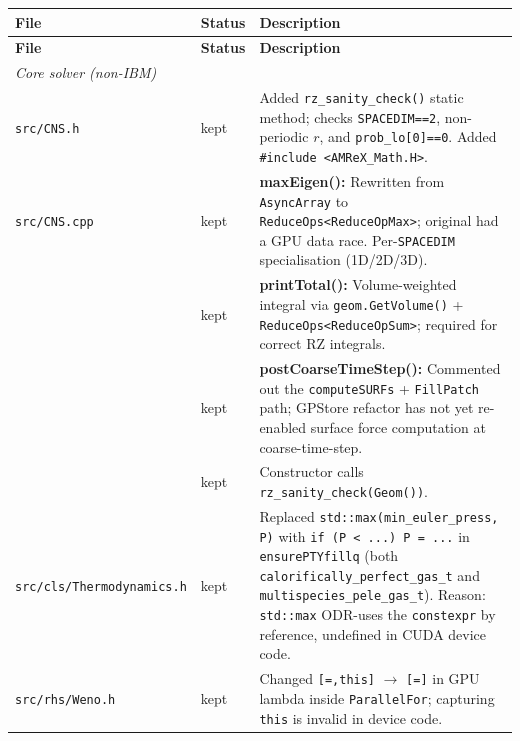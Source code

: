 \documentclass[11pt,a4paper]{article}
\begin{document}
\begin{longtable}{p{4.2cm} p{1.2cm} p{8.5cm}}
\toprule
\textbf{File} & \textbf{Status} & \textbf{Description} \\
\midrule
\endfirsthead
\toprule
\textbf{File} & \textbf{Status} & \textbf{Description} \\
\midrule
\endhead

\multicolumn{3}{l}{\textit{Core solver (non-IBM)}} \\
\midrule

\texttt{src/CNS.h}
  & \color{kept}kept
  & Added \texttt{rz\_sanity\_check()} static method; checks
    \texttt{SPACEDIM==2}, non-periodic $r$, and \texttt{prob\_lo[0]==0}.
    Added \texttt{\#include <AMReX\_Math.H>}. \\

\texttt{src/CNS.cpp}
  & \color{kept}kept
  & \textbf{maxEigen():} Rewritten from \texttt{AsyncArray} to
    \texttt{ReduceOps<ReduceOpMax>}; original had a GPU data race.
    Per-\texttt{SPACEDIM} specialisation (1D/2D/3D). \\

  & \color{kept}kept
  & \textbf{printTotal():} Volume-weighted integral via
    \texttt{geom.GetVolume()} + \texttt{ReduceOps<ReduceOpSum>};
    required for correct RZ integrals. \\

  & \color{kept}kept
  & \textbf{postCoarseTimeStep():} Commented out the \texttt{computeSURFs}
    + \texttt{FillPatch} path; GPStore refactor has not yet re-enabled
    surface force computation at coarse-time-step. \\

  & \color{kept}kept
  & Constructor calls \texttt{rz\_sanity\_check(Geom())}. \\

\texttt{src/cls/Thermodynamics.h}
  & \color{kept}kept
  & Replaced \texttt{std::max(min\_euler\_press, P)} with
    \texttt{if (P < ...) P = ...} in \texttt{ensurePTYfillq} (both
    \texttt{calorifically\_perfect\_gas\_t} and
    \texttt{multispecies\_pele\_gas\_t}).  Reason: \texttt{std::max}
    ODR-uses the \texttt{constexpr} by reference, undefined in CUDA
    device code. \\

\texttt{src/rhs/Weno.h}
  & \color{kept}kept
  & Changed \texttt{[=,this]} $\to$ \texttt{[=]} in GPU lambda inside
    \texttt{ParallelFor}; capturing \texttt{this} is invalid in device
    code. \\


\end{longtable}
\end{document}
